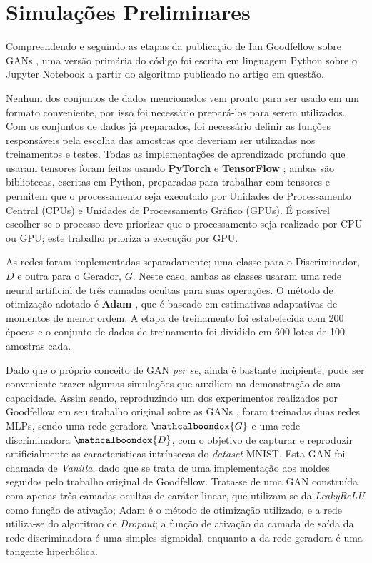 \section{Simulações Preliminares}
\label{sec:results_preliminary_simulations}

Compreendendo e seguindo as etapas da publicação de Ian Goodfellow sobre GANs \citep{NIPS2014_5423}, uma versão primária do código foi escrita em linguagem Python sobre o Jupyter Notebook a partir do algoritmo publicado no artigo em questão.

Nenhum dos conjuntos de dados mencionados vem pronto para ser usado em um formato conveniente, por isso foi necessário prepará-los para serem utilizados. Com os conjuntos de dados já preparados, foi necessário definir as funções responsáveis pela escolha das amostras que deveriam ser utilizadas nos treinamentos e testes. Todas as implementações de aprendizado profundo que usaram tensores foram feitas usando \textbf{PyTorch} \citep{paszke2017pytorch} e \textbf{TensorFlow} \citep{abadi2016tensorflow}; ambas são bibliotecas, escritas em Python, preparadas para trabalhar com tensores e permitem que o processamento seja executado por Unidades de Processamento Central (CPUs) e Unidades de Processamento Gráfico (GPUs). É possível escolher se o processo deve priorizar que o processamento seja realizado por CPU ou GPU; este trabalho prioriza a execução por GPU.

As redes foram implementadas separadamente; uma classe para o Discriminador, $D$ e outra para o Gerador, $G$. Neste caso, ambas as classes usaram uma rede neural artificial de três camadas ocultas para suas operações. O método de otimização adotado é \textbf{Adam} \citep{kingma2014adam}, que é baseado em estimativas adaptativas de momentos de menor ordem. A etapa de treinamento foi estabelecida com 200 épocas e o conjunto de dados de treinamento foi dividido em 600 lotes de 100 amostras cada.

Dado que o próprio conceito de GAN \textit{per se}, ainda é bastante incipiente, pode ser conveniente trazer algumas simulações que auxiliem na demonstração de sua capacidade. Assim sendo, reproduzindo um dos experimentos realizados por Goodfellow em seu trabalho original sobre as GANs \citep{NIPS2014_5423}, foram treinadas duas redes MLPs, sendo uma rede geradora $\mathcalboondox{G}$ e uma rede discriminadora $\mathcalboondox{D}$, com o objetivo de capturar e reproduzir artificialmente as características intrínsecas do \textit{dataset} MNIST. Esta GAN foi chamada de \textit{Vanilla}, dado que se trata de uma implementação aos moldes seguidos pelo trabalho original de Goodfellow. Trata-se de uma GAN construída com apenas três camadas ocultas de caráter linear, que utilizam-se da \textit{LeakyReLU} como função de ativação; Adam é o método de otimização utilizado, e a rede utiliza-se do algoritmo de \textit{Dropout}; a função de ativação da camada de saída da rede discriminadora é uma simples sigmoidal, enquanto a da rede geradora é uma tangente hiperbólica.

